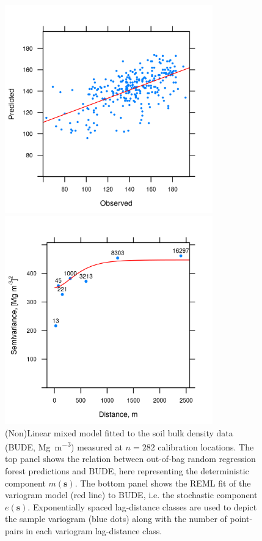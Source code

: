 {\begin{figure}[!ht]
 \centering
 \begin{minipage}{90mm}
  \subcaption{}
  \centering
  \includegraphics[width = 90mm, draft = true]{fig/chap07-random-forest-fit}
 \end{minipage}
 \begin{minipage}{90mm}
  \centering
  \subcaption{}
  \includegraphics[width = 90mm]{fig/chap07-bude-vario}
 \end{minipage}
 \caption[(Non)Linear mixed model fitted to the soil bulk density data.]{(Non)Linear mixed model fitted to the 
 soil bulk density data (BUDE, \si{\mega\gram\per\cubic\metre}) measured at $n = 282$ calibration locations. 
 The top panel shows the relation between out-of-bag random regression forest predictions and BUDE, here
 representing the deterministic component $m(\boldsymbol{s})$. The bottom panel shows the REML fit of the 
 variogram model (red line) to BUDE, i.e. the stochastic component $e(\boldsymbol{s})$. Exponentially spaced
 lag-distance classes are used to depict the sample variogram (blue dots) along with the number of point-pairs
 in each variogram lag-distance class.}
 \label{fig:chap07-bude-vario}
\end{figure}

}
